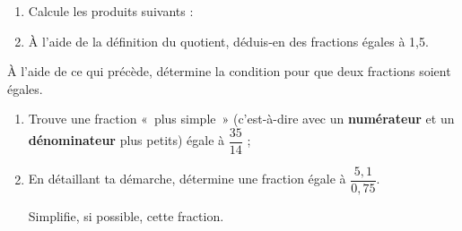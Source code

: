 \begin{activite}
\begin{partie}
\begin{enumerate}
 \item Calcule les produits suivants :
 \item À l'aide de la définition du quotient, déduis‑en des fractions égales à 1,5.
 \end{enumerate}
\end{partie}

\begin{partie}[Synthèse]
À l'aide de ce qui précède, détermine la condition pour que deux fractions soient égales.
\end{partie}

\begin{partie}
\begin{enumerate}
 \item Trouve une fraction « plus simple » (c'est-à-dire avec un \textbf{numérateur} et un \textbf{dénominateur} plus petits) égale à $\dfrac{35}{14}$ ;
 \item En détaillant ta démarche, détermine une fraction égale à $\dfrac{5,1}{0,75}$.
 
Simplifie, si possible, cette fraction.
 \end{enumerate}
\end{partie}

\end{activite}


